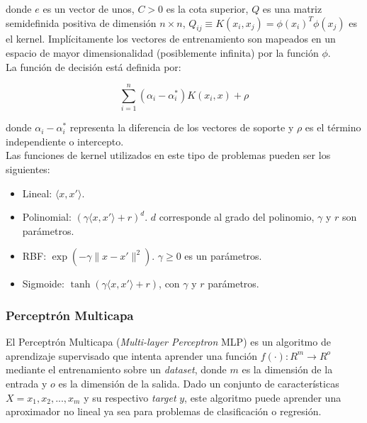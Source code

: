 \documentclass[spanish]{article}
\begin{document}
          donde $e$ es un vector de unos, $C > 0$ es la cota superior, $Q$ es una matriz semidefinida 
          positiva de dimensión $n \times n$, $Q_{ij} \equiv K(x_i, x_j) = \phi (x_i)^T \phi (x_j)$ es 
          el kernel. Implícitamente los vectores de entrenamiento son mapeados en un espacio de mayor 
          dimensionalidad (posiblemente infinita) por la función $\phi$. \\
          
          La función de decisión está definida por:
          
          \begin{equation}
            \sum_{i=1}^n (\alpha_i - \alpha_i^*) K(x_i, x) + \rho
          \end{equation}
          
          donde $\alpha_i - \alpha_i^*$ representa la diferencia de los vectores de soporte y $\rho$ 
          es el término independiente o intercepto. \\
          
          Las funciones de kernel utilizados en este tipo de problemas pueden ser los siguientes:
          \begin{itemize}
            \item Lineal: $\langle x, x'\rangle$.
            \item Polinomial: $(\gamma \langle x, x'\rangle + r)^d$. $d$ corresponde al grado del 
              polinomio, $\gamma$ y $r$ son parámetros.
            \item RBF: $\exp(-\gamma \|x-x'\|^2)$. $\gamma\geq 0$ es un parámetros.
            \item Sigmoide: $\tanh(\gamma \langle x,x'\rangle + r)$, con $\gamma$ y $r$ parámetros.
          \end{itemize}
                
            
        \subsubsection{Perceptrón Multicapa}
            
          El Perceptrón Multicapa (\emph{Multi-layer Perceptron} MLP) \cite{rumelhart1986learning}
           es un algoritmo de aprendizaje 
          supervisado que intenta aprender una función $f(\cdot): R^m \rightarrow R^o$ mediante el 
          entrenamiento sobre un \emph{dataset}, donde $m$ es la dimensión de la entrada y $o$
          es la dimensión de la salida. Dado un conjunto de características $X = {x_1, x_2, ..., x_m}$ 
          y su respectivo \emph{target} $y$, este algoritmo puede aprender una aproximador no lineal 
          ya sea para problemas de clasificación o regresión. \medskip
          
\end{document}
